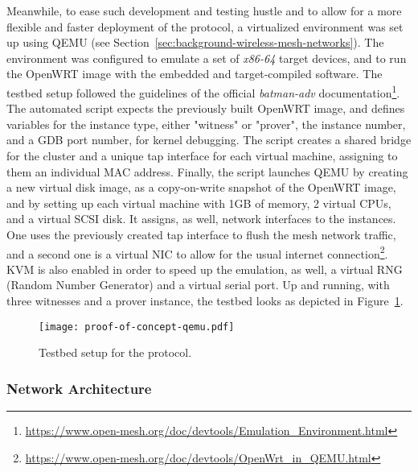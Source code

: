 Meanwhile, to ease such development and testing hustle and to allow for a more flexible and faster deployment of the protocol, a virtualized environment was set up using QEMU (see Section~\ref{sec:background-wireless-mesh-networks}). The environment was configured to emulate a set of \emph{x86-64} target devices, and to run the OpenWRT image with the embedded and target-compiled \pol{} software. The testbed setup followed the guidelines of the official \emph{batman-adv} documentation\footnote{\url{https://www.open-mesh.org/doc/devtools/Emulation_Environment.html}}. The automated script expects the previously built OpenWRT image, and defines variables for the instance type, either "witness" or "prover", the instance number, and a GDB port number, for kernel debugging. The script creates a shared bridge for the cluster and a unique tap interface for each virtual machine, assigning to them an individual MAC address. Finally, the script launches QEMU by creating a new virtual disk image, as a copy-on-write snapshot of the OpenWRT image, and by setting up each virtual machine with 1GB of memory, 2 virtual CPUs, and a virtual SCSI disk. It assigns, as well, network interfaces to the instances. One uses the previously created tap interface to flush the mesh network traffic, and a second one is a virtual NIC to allow for the usual internet connection\footnote{\url{https://www.open-mesh.org/doc/devtools/OpenWrt_in_QEMU.html}}. KVM is also enabled in order to speed up the emulation, as well, a virtual RNG (Random Number Generator) and a virtual serial port. Up and running, with three witnesses and a prover instance, the testbed looks as depicted in Figure~\ref{fig:infrastructure:testbed}.

\begin{figure}[h!]
    \begin{center}
    \texttt{[image: proof-of-concept-qemu.pdf]}
    \caption{Testbed setup for the \pol{} protocol.}
    \label{fig:infrastructure:testbed}
    \end{center}
\end{figure}

\subsubsection{Network Architecture} \label{sec:infrastructure:network-architecture}

